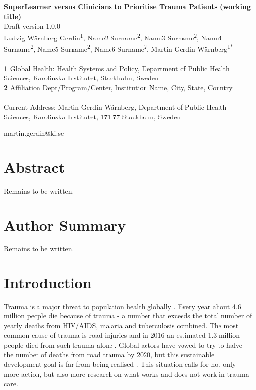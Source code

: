 \documentclass[10pt,letterpaper]{article}\usepackage[]{graphicx}\usepackage[]{color}
\begin{document}
{\Large
  \noindent\textbf{SuperLearner versus Clinicians to Prioritise Trauma Patients (working title)}
} \newline
\\
{\large
  Draft version 1.0.0
}
\newline
\\
Ludvig Wärnberg Gerdin\textsuperscript{1}, %
Name2 Surname\textsuperscript{2}, %
Name3 Surname\textsuperscript{2}, 
Name4 Surname\textsuperscript{2}, 
Name5 Surname\textsuperscript{2}, 
Name6 Surname\textsuperscript{2}, 
Martin Gerdin Wärnberg\textsuperscript{1*\textcurrency}
\\
\bigskip
\\
\textbf{1} Global Health: Health Systems and Policy, Department of Public Health Sciences, Karolinska Institutet, Stockholm, Sweden
\\
\textbf{2} Affiliation Dept/Program/Center, Institution Name, City, State,
Country
\\
\bigskip
\\
\textcurrency Current Address: Martin Gerdin Wärnberg, Department of Public
Health Sciences, Karolinska Institutet, 171 77 Stockholm, Sweden

\noindent * martin.gerdin@ki.se
\section*{Abstract}
Remains to be written.
\section*{Author Summary}
Remains to be written.
\section*{Introduction}
Trauma is a major threat to population health globally
\cite{Brohi2017,GBD2017}. Every year about 4.6 million people die because of
trauma - a number that exceeds the total number of yearly deaths from HIV/AIDS,
malaria and tuberculosis combined. The most common cause of trauma is road
injuries and in 2016 an estimated 1.3 million people died from such trauma alone
\cite{GBD2017}. Global actors have vowed to try to halve the number of deaths
from road trauma by 2020, but this sustainable development goal is far from
being realised \cite{UN2018}. This situation calls for not only more action, but
also more research on what works and does not work in trauma care.
\end{document}
